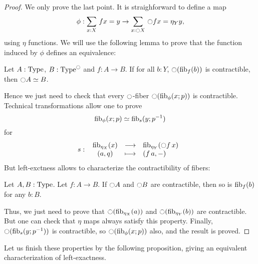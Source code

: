 \begin{proof}
  We only prove the last point.
  It is straighforward to define a map
  \[ \phi:\sum_{x:X}\, f x = y\to
    \sum_{x:\ocircle X}\, \ocircle f x = \eta_Y y,\]
  using $\eta$ functions.
  We will use the following lemma to prove that the function induced
  by $\phi$ defines an equivalence:
  \begin{lem}
    Let $A:\operatorname{Type}$, $B:\operatorname{Type}^{\ocircle}$ and $f:A\to B$. If for all $b:Y$,
    $\ocircle (\mathrm{fib}_{f}(b))$ is contractible, then $\ocircle A \simeq B$.
  \end{lem}
  Hence we just need to check that every $\ocircle$-fiber $\ocircle(\mathrm{fib}_{\phi}(x;p))$ is contractible.
  Technical transformations allow one to prove
  \[ \mathrm{fib}_{\phi}(x;p) \simeq \mathrm{fib}_{s}(y;p^{-1})\]
  for
  \[
    s \, \colon \left. \begin{array}{ccl} \mathrm{fib}_{\eta_X}(x) & \longrightarrow & \mathrm{fib}_{\eta_Y}(\ocircle f\, x) \\ (a,q) & \longmapsto & (f\, a,-) \end{array} \right.
  \]
  But left-exctness allows to characterize the contractibility of fibers:
  \begin{lem}
    Let $A,B:\operatorname{Type}$. Let $f:A\to B$. If $\ocircle A$ and $\ocircle B$ are
    contractible, then so is $\mathrm{fib}_{f}(b)$ for any $b:B$.
  \end{lem}
  Thus, we just need to prove that $\ocircle(\mathrm{fib}_{\eta_X}(a))$ and
  $\ocircle(\mathrm{fib}_{\eta_Y}(b))$ are contractible. But one can check that
  $\eta$ maps always satisfy this property.
  Finally, $\ocircle(\mathrm{fib}_{s}(y;p^{-1}))$ is contractible, so $\ocircle(\mathrm{fib}_{\phi}(x;p))$ also, and the result is proved.

\end{proof}

Let us finish these properties by the following proposition, giving
an equivalent characterization of left-exactness.

